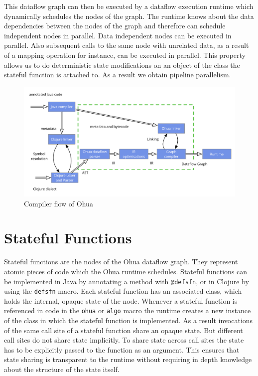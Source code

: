 This dataflow graph can then be executed by a dataflow execution runtime which dynamically schedules the nodes of the graph.
The runtime knows about the data dependencies between the nodes of the graph and therefore can schedule independent nodes in parallel.
Data independent nodes can be executed in parallel.
Also subsequent calls to the same node with unrelated data, as a result of a mapping operation for instance, can be executed in parallel.
This property allows us to do deterministic state modifications on an object of the class the stateful function is attached to.
As a result we obtain pipeline parallelism.


\begin{figure}
  \includegraphics[width=\linewidth]{../Figures/ohua-compiler-flow}
  \caption{Compiler flow of Ohua}
  \label{fig:ohua-compiler-flow}
\end{figure}


\section{Stateful Functions}


Stateful functions are the nodes of the Ohua dataflow graph.
They represent atomic pieces of code which the Ohua runtime schedules.
Stateful functions can be implemented in Java by annotating a method with \texttt{@defsfn}, or in Clojure by using the \texttt{defsfn} macro.
Each stateful function has an associated class, which holds the internal, opaque state of the node.
Whenever a stateful function is referenced in code in the \texttt{ohua} or \texttt{algo} macro the runtime creates a new instance of the class in which the stateful function is implemented.
As a result invocations of the same call site of a stateful function share an opaque state.
But different call sites do not share state implicitly.
To share state across call sites the state has to be explicitly passed to the function as an argument.
This ensures that state sharing is transparent to the runtime without requiring in depth knowledge about the structure of the state itself.


